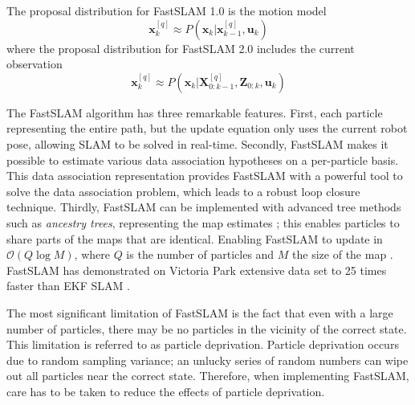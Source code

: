 The proposal distribution for FastSLAM 1.0 is the motion model
\begin{equation}
    \mathbf{x}_k^{[q]}  \approx P(\mathbf{x}_k|\mathbf{x}_{k-1}^{[q]}, \mathbf{u}_k)
\end{equation}
where the proposal distribution for FastSLAM 2.0 includes the current observation
\begin{equation}
    \mathbf{x}_k^{[q]} \approx P(\mathbf{x}_k|\mathbf{X}_{0:k-1}^{[q]}, \mathbf{Z}_{0:k}, \mathbf{u}_k)
\label{eq:fast-1}
\end{equation}

The FastSLAM algorithm has three remarkable features. First, each particle representing the entire path, but the update equation only uses the current robot pose, allowing SLAM to be solved in real-time. Secondly, FastSLAM makes it possible to estimate various data association hypotheses on a per-particle basis. This data association representation provides FastSLAM with a powerful tool to solve the data association problem, which leads to a robust loop closure technique. Thirdly, FastSLAM can be implemented with advanced tree methods such as \textit{ancestry trees}, representing the map estimates \cite{DP-SLAM}; this enables particles to share parts of the maps that are identical. Enabling FastSLAM to update in $\mathcal{O}(Q\log{}M)$, where $Q$ is the number of particles and $M$ the size of the map \cite{Siegwart2004}. FastSLAM has demonstrated on Victoria Park extensive data set to 25 times faster than EKF SLAM \cite{Thrun2004}.

The most significant limitation of FastSLAM is the fact that even with a large number of particles, there may be no particles in the vicinity of the correct state\cite{Thrun2006}. This limitation is referred to as particle deprivation. Particle deprivation occurs due to random sampling variance; an unlucky series of random numbers can wipe out all particles near the correct state. Therefore, when implementing FastSLAM, care has to be taken to reduce the effects of particle deprivation.

